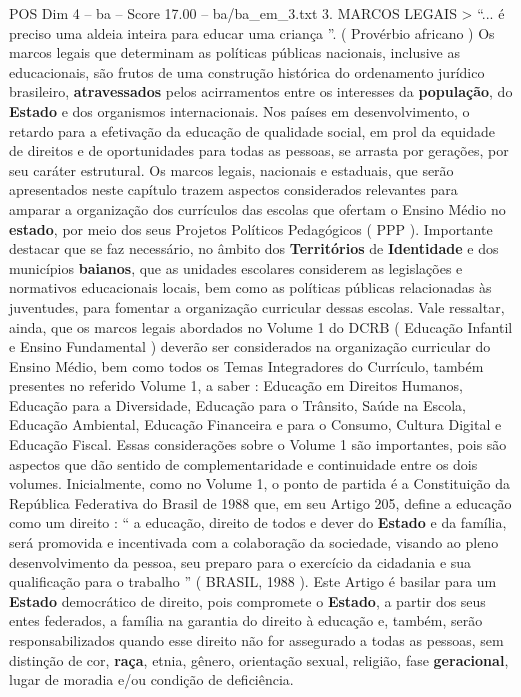 \begin{textsample}{POS Dim 4 – ba – Score 17.00 – ba/ba\_em\_3.txt}  \label{ex:f4_pos_024}
3.
MARCOS LEGAIS > “... é preciso uma aldeia inteira para educar uma criança ”. ( Provérbio africano ) Os marcos legais que determinam as políticas públicas nacionais, inclusive as educacionais, são frutos de uma construção histórica do ordenamento jurídico brasileiro, \textbf{atravessados} pelos acirramentos entre os interesses da \textbf{população}, do \textbf{Estado} e dos organismos internacionais.
Nos países em desenvolvimento, o retardo para a efetivação da educação de qualidade social, em prol da equidade de direitos e de oportunidades para todas as pessoas, se arrasta por gerações, por seu caráter estrutural.
Os marcos legais, nacionais e estaduais, que serão apresentados neste capítulo trazem aspectos considerados relevantes para amparar a organização dos currículos das escolas que ofertam o Ensino Médio no \textbf{estado}, por meio dos seus Projetos Políticos Pedagógicos ( PPP ).
Importante destacar que se faz necessário, no âmbito dos \textbf{Territórios} de \textbf{Identidade} e dos municípios \textbf{baianos}, que as unidades escolares considerem as legislações e normativos educacionais locais, bem como as políticas públicas relacionadas às juventudes, para fomentar a organização curricular dessas escolas.
Vale ressaltar, ainda, que os marcos legais abordados no Volume 1 do DCRB ( Educação Infantil e Ensino Fundamental ) deverão ser considerados na organização curricular do Ensino Médio, bem como todos os Temas Integradores do Currículo, também presentes no referido Volume 1, a saber : Educação em Direitos Humanos, Educação para a Diversidade, Educação para o Trânsito, Saúde na Escola, Educação Ambiental, Educação Financeira e para o Consumo, Cultura Digital e Educação Fiscal.
Essas considerações sobre o Volume 1 são importantes, pois são aspectos que dão sentido de complementaridade e continuidade entre os dois volumes.
Inicialmente, como no Volume 1, o ponto de partida é a Constituição da República Federativa do Brasil de 1988 que, em seu Artigo 205, define a educação como um direito : “ a educação, direito de todos e dever do \textbf{Estado} e da família, será promovida e incentivada com a colaboração da sociedade, visando ao pleno desenvolvimento da pessoa, seu preparo para o exercício da cidadania e sua qualificação para o trabalho ” ( BRASIL, 1988 ).
Este Artigo é basilar para um \textbf{Estado} democrático de direito, pois compromete o \textbf{Estado}, a partir dos seus entes federados, a família na garantia do direito à educação e, também, serão responsabilizados quando esse direito não for assegurado a todas as pessoas, sem distinção de cor, \textbf{raça}, etnia, gênero, orientação sexual, religião, fase \textbf{geracional}, lugar de moradia e/ou condição de deficiência.

\end{textsample}
